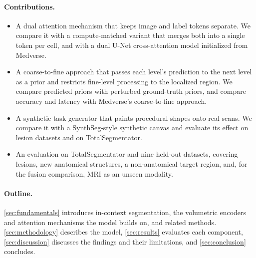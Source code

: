 \paragraph{Contributions.}
\begin{itemize}[leftmargin=1.4em,itemsep=0.1em]
  \item A dual attention mechanism that keeps image and label tokens separate.
    We compare it with a compute-matched variant that merges both into a single
    token per cell, and with a dual U-Net cross-attention model initialized
    from Medverse.
  \item A coarse-to-fine approach that passes each level's prediction to the
    next level as a prior and restricts fine-level processing to the localized
    region. We compare predicted priors with perturbed ground-truth priors, and
    compare accuracy and latency with Medverse's coarse-to-fine approach.
  \item A synthetic task generator that paints procedural shapes onto real
    scans. We compare it with a SynthSeg-style synthetic canvas and evaluate
    its effect on lesion datasets and on TotalSegmentator.
  \item An evaluation on TotalSegmentator and nine held-out datasets, covering
    lesions, new anatomical structures, a non-anatomical target region, and,
    for the fusion comparison, MRI as an unseen modality.
\end{itemize}

\paragraph{Outline.}
\autoref{sec:fundamentals} introduces in-context segmentation, the volumetric
encoders and attention mechanisms the model builds on, and related methods.
\autoref{sec:methodology} describes the model, \autoref{sec:results} evaluates
each component, \autoref{sec:discussion} discusses the findings and their
limitations, and \autoref{sec:conclusion} concludes.